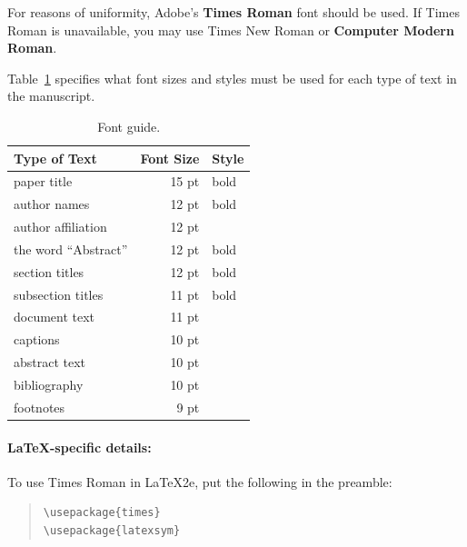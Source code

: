\documentclass[11pt,a4paper]{article}
\begin{document}
For reasons of uniformity, Adobe's \textbf{Times Roman} font should be used.
If Times Roman is unavailable, you may use Times New Roman or \textbf{Computer Modern Roman}.

Table~\ref{font-table} specifies what font sizes and styles must be used for each type of text in the manuscript.

\begin{table}
  \centering
  \begin{tabular}{lrl}
    \hline \textbf{Type of Text} & \textbf{Font Size} & \textbf{Style} \\ \hline
    paper title                  & 15 pt              & bold           \\
    author names                 & 12 pt              & bold           \\
    author affiliation           & 12 pt              &                \\
    the word ``Abstract''        & 12 pt              & bold           \\
    section titles               & 12 pt              & bold           \\
    subsection titles            & 11 pt              & bold           \\
    document text                & 11 pt              &                \\
    captions                     & 10 pt              &                \\
    abstract text                & 10 pt              &                \\
    bibliography                 & 10 pt              &                \\
    footnotes                    & 9 pt               &                \\
    \hline
  \end{tabular}
  \caption{\label{font-table} Font guide. }
\end{table}

\paragraph{\LaTeX-specific details:}
To use Times Roman in \LaTeX2e{}, put the following in the preamble:
\begin{quote}
  \small
  \begin{verbatim}
\usepackage{times}
\usepackage{latexsym}
\end{verbatim}
\end{quote}
\end{document}
